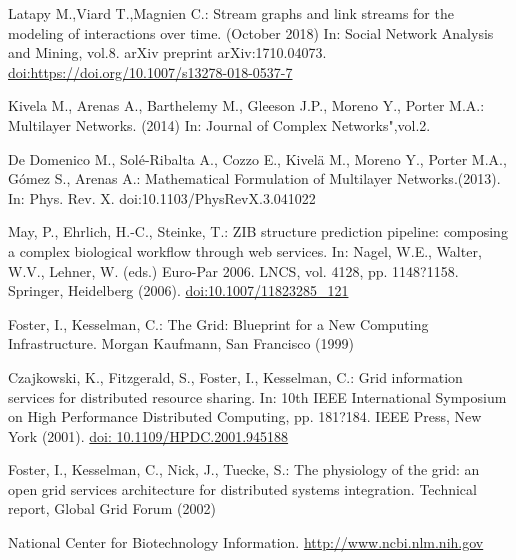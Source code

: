 \documentclass{svproc}
\begin{document}
%
\begin{thebibliography}{6}
%


Latapy M.,Viard T.,Magnien C.: Stream graphs and link streams for the modeling
of interactions over time. (October 2018) In: Social Network Analysis and Mining, vol.8. arXiv preprint arXiv:1710.04073. \url{doi:https://doi.org/10.1007/s13278-018-0537-7}

Kivela M., Arenas A., Barthelemy M., Gleeson J.P., Moreno Y., Porter M.A.: Multilayer Networks. (2014) In: Journal of Complex Networks",vol.2.

De Domenico M., Sol\'e-Ribalta A., Cozzo E., Kivel\"a M., Moreno Y., Porter M.A., G\'omez S., Arenas A.: Mathematical Formulation of Multilayer Networks.(2013). In: Phys. Rev. X. doi:10.1103/PhysRevX.3.041022


May, P., Ehrlich, H.-C., Steinke, T.: ZIB structure prediction pipeline:
composing a complex biological workflow through web services.
In: Nagel, W.E., Walter, W.V., Lehner, W. (eds.) Euro-Par 2006.
LNCS, vol. 4128, pp. 1148?1158. Springer, Heidelberg (2006).
\url{doi:10.1007/11823285_121}


Foster, I., Kesselman, C.: The Grid: Blueprint for a New Computing Infrastructure.
Morgan Kaufmann, San Francisco (1999)

Czajkowski, K., Fitzgerald, S., Foster, I., Kesselman, C.: Grid information services
for distributed resource sharing. In: 10th IEEE International Symposium
on High Performance Distributed Computing, pp. 181?184. IEEE Press, New York (2001).
\url{doi: 10.1109/HPDC.2001.945188}

Foster, I., Kesselman, C., Nick, J., Tuecke, S.: The physiology of the grid: an open grid services architecture for distributed systems integration. Technical report, Global Grid
Forum (2002)

National Center for Biotechnology Information. \url{http://www.ncbi.nlm.nih.gov}


\end{thebibliography}
\end{document}
